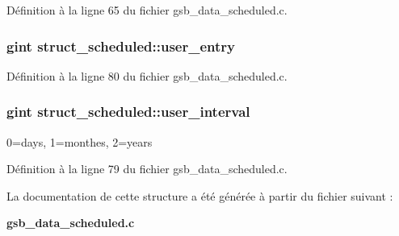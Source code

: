 Définition à la ligne 65 du fichier gsb\_\-data\_\-scheduled.c.

\subsubsection[{user\_\-entry}]{\setlength{\rightskip}{0pt plus 5cm}gint {\bf struct\_\-scheduled::user\_\-entry}}\label{structstruct__scheduled_add0f58bd98f9e5be02219db1666ac1de}


Définition à la ligne 80 du fichier gsb\_\-data\_\-scheduled.c.

\subsubsection[{user\_\-interval}]{\setlength{\rightskip}{0pt plus 5cm}gint {\bf struct\_\-scheduled::user\_\-interval}}\label{structstruct__scheduled_a7b3dc4789d62bb87eaad8052c9521e1e}
0=days, 1=monthes, 2=years 

Définition à la ligne 79 du fichier gsb\_\-data\_\-scheduled.c.



La documentation de cette structure a été générée à partir du fichier suivant :\begin{DoxyCompactItemize}
\item 
{\bf gsb\_\-data\_\-scheduled.c}\end{DoxyCompactItemize}
